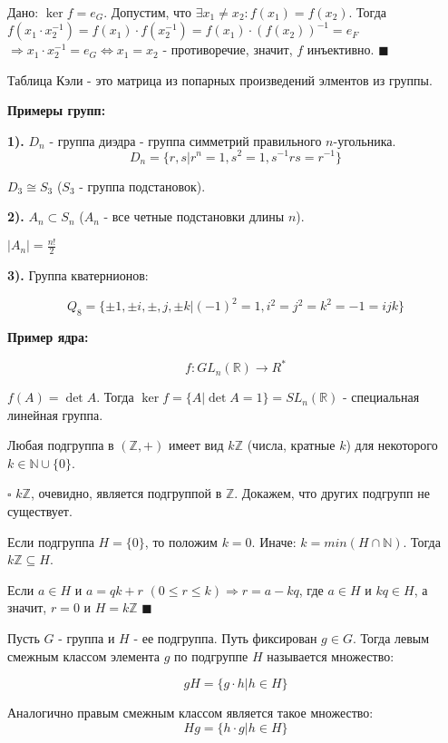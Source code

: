 \documentclass[a4paper,11pt]{article}
\newcommand{\stmnt}[1]{\fbox{\textbf{#1}}}
\newcommand{\void}{\vspace{\baselineskip}}
\newcommand{\R}{\mathbb{R}}
\newcommand{\N}{\mathbb{N}}
\newcommand{\Z}{\mathbb{Z}}
\newcommand{\abs}[1]{\vert #1\vert}
\newcommand{\numsec}[1]{\textbf{#1).}}
\begin{document}
    Дано: $\ker{f} = e_G$. Допустим, что $\exists x_1\neq x_2: f(x_1) = f(x_2)$.
    Тогда $f(x_1\cdot x_2^{-1}) = f(x_1)\cdot f(x_2^{-1}) = f(x_1)\cdot(f(x_2))^{-1} = e_F$
    $\Rightarrow x_1\cdot x_2^{-1} = e_G \Leftrightarrow x_1 = x_2$ - противоречие, значит,
    $f$ инъективно. $\blacksquare$

    \void
    \stmnt{Опр} Таблица Кэли - это матрица из попарных произведений элментов из группы.

    \void
    \textbf{Примеры групп:}

    \numsec{1} $D_n$ - группа диэдра - группа симметрий правильного $n$-угольника.
    $$D_n = \{r, s\vert r^n = 1, s^2 = 1, s^{-1}rs = r^{-1}\}$$

    \stmnt{Утв} $D_3\cong S_3$ ($S_3$ - группа подстановок).

    \void
    \numsec{2} $A_n\subset S_n $ ($A_n$ - все четные подстановки длины $n$).

    $\abs{A_n} = \frac{n!}{2}$

    \void
    \numsec{3} Группа кватернионов:

    $$Q_8 = \{\pm 1,\pm i,\pm, j,\pm k\vert (-1)^2 = 1, i^2 = j^2 = k^2 = -1 = ijk\}$$

    \void
    \textbf{Пример ядра:}

    $$f: GL_n(\R)\rightarrow R^*$$

    $f(A) = \det{A}$. Тогда $\ker f = \{A\vert \det{A} = 1\} = SL_n(\R)$ - специальная линейная группа.

    \void
    \stmnt{Утв} Любая подгруппа в $(\Z, +)$ имеет вид $k\Z$ (числа, кратные $k$) для некоторого $k\in \N\cup\{0\}$.

    \void
    $\square$ $k\Z$, очевидно, является подгруппой в $\Z$. Докажем, что других подгрупп не существует.

    Если подгруппа $H = \{0\}$, то положим $k = 0$. Иначе: $k = min(H\cap\N)$. Тогда $k\Z\subseteq H$.

    Если $a\in H$ и $a = qk + r$ $(0\leq r\le k) \Rightarrow r = a - kq$, где $a\in H$ и $kq\in H$, а значит,
    $r = 0$ и $H = k\Z$ $\blacksquare$

    \void
    \stmnt{Опр} Пусть $G$ - группа и $H$ - ее подгруппа. Путь фиксирован $g\in G$. Тогда левым смежным классом
    элемента $g$ по подгруппе $H$ называется множество:

    $$ gH = \{g\cdot h\vert h\in H\} $$

    Аналогично правым смежным классом является такое множество:
    $$ Hg = \{h\cdot g\vert h\in H\} $$
\end{document}

